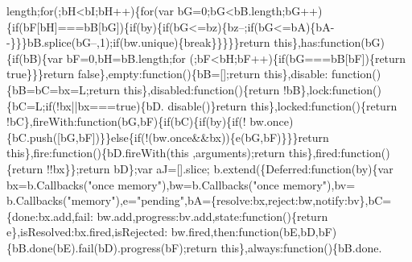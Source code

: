 \begin{DoxyCode}
      length;\textcolor{keywordflow}{for}(;bH<bI;bH++)\{\textcolor{keywordflow}{for}(var bG=0;bG<bB.length;bG++)\{\textcolor{keywordflow}{if}(bF[bH]===bB[bG])\{\textcolor{keywordflow}{if}(by)\{\textcolor{keywordflow}{if}(bG<=bz)\{bz--;\textcolor{keywordflow}{if}(bG<=bA)\{bA-
      -\}\}\}bB.splice(bG--,1);\textcolor{keywordflow}{if}(bw.unique)\{\textcolor{keywordflow}{break}\}\}\}\}\}\textcolor{keywordflow}{return} \textcolor{keyword}{this}\},has:\textcolor{keyword}{function}(bG)\{\textcolor{keywordflow}{if}(bB)\{var bF=0,bH=bB.length;\textcolor{keywordflow}{for}
      (;bF<bH;bF++)\{\textcolor{keywordflow}{if}(bG===bB[bF])\{\textcolor{keywordflow}{return} \textcolor{keyword}{true}\}\}\}\textcolor{keywordflow}{return} \textcolor{keyword}{false}\},empty:\textcolor{keyword}{function}()\{bB=[];\textcolor{keywordflow}{return} \textcolor{keyword}{this}\},disable:\textcolor{keyword}{
      function}()\{bB=bC=bx=L;\textcolor{keywordflow}{return} \textcolor{keyword}{this}\},disabled:\textcolor{keyword}{function}()\{\textcolor{keywordflow}{return} !bB\},lock:\textcolor{keyword}{function}()\{bC=L;\textcolor{keywordflow}{if}(!bx||bx===\textcolor{keyword}{true})\{bD.
      disable()\}\textcolor{keywordflow}{return} \textcolor{keyword}{this}\},locked:\textcolor{keyword}{function}()\{\textcolor{keywordflow}{return} !bC\},fireWith:\textcolor{keyword}{function}(bG,bF)\{\textcolor{keywordflow}{if}(bC)\{\textcolor{keywordflow}{if}(by)\{\textcolor{keywordflow}{if}(!
      bw.once)\{bC.push([bG,bF])\}\}\textcolor{keywordflow}{else}\{\textcolor{keywordflow}{if}(!(bw.once&&bx))\{e(bG,bF)\}\}\}\textcolor{keywordflow}{return} \textcolor{keyword}{this}\},fire:\textcolor{keyword}{function}()\{bD.fireWith(\textcolor{keyword}{this}
      ,arguments);\textcolor{keywordflow}{return} \textcolor{keyword}{this}\},fired:\textcolor{keyword}{function}()\{\textcolor{keywordflow}{return} !!bx\}\};\textcolor{keywordflow}{return} bD\};var aJ=[].slice;
      b.extend(\{Deferred:\textcolor{keyword}{function}(by)\{var bx=b.Callbacks(\textcolor{stringliteral}{"once memory"}),bw=b.Callbacks(\textcolor{stringliteral}{"once memory"}),bv=
      b.Callbacks(\textcolor{stringliteral}{"memory"}),e=\textcolor{stringliteral}{"pending"},bA=\{resolve:bx,reject:bw,notify:bv\},bC=\{done:bx.add,fail:
      bw.add,progress:bv.add,state:\textcolor{keyword}{function}()\{\textcolor{keywordflow}{return} e\},isResolved:bx.fired,isRejected:
      bw.fired,then:\textcolor{keyword}{function}(bE,bD,bF)\{bB.done(bE).fail(bD).progress(bF);\textcolor{keywordflow}{return} \textcolor{keyword}{this}\},always:\textcolor{keyword}{function}()\{bB.done.

\end{DoxyCode}
